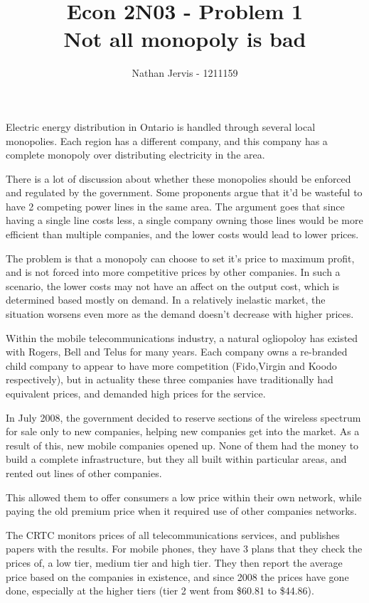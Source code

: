 \documentclass{article}
\title{Econ 2N03 - Problem 1\\Not all monopoly is bad}
\author{Nathan Jervis - 1211159}
\begin{document}
\maketitle

Electric energy distribution in Ontario is handled through several local monopolies. Each region has a different company, and this company has a complete monopoly over distributing electricity in the area.

There is a lot of discussion about whether these monopolies should be enforced and regulated by the government. Some proponents argue that it'd be wasteful to have 2 competing power lines in the same area. The argument goes that since having a single line costs less, a single company owning those lines would be more efficient than multiple companies, and the lower costs would lead to lower prices.

The problem is that a monopoly can choose to set it's price to maximum profit, and is not forced into more competitive prices by other companies. In such a scenario, the lower costs may not have an affect on the output cost, which is determined based mostly on demand. In a relatively inelastic market, the situation worsens even more as the demand doesn't decrease with higher prices.

Within the mobile telecommunications industry, a natural ogliopoloy has existed with Rogers, Bell and Telus for many years. Each company owns a re-branded child company to appear to have more competition (Fido,Virgin and Koodo respectively), but in actuality these three companies have traditionally had equivalent prices, and demanded high prices for the service.

In July 2008, the government decided to reserve sections of the wireless spectrum for sale only to new companies, helping new companies get into the market. As a result of this, new mobile companies opened up. None of them had the money to build a complete infrastructure, but they all built within particular areas, and rented out lines of other companies.

This allowed them to offer consumers a low price within their own network, while paying the old premium price when it required use of other companies networks.

The CRTC monitors prices of all telecommunications services, and publishes papers with the results. For mobile phones, they have 3 plans that they check the prices of, a low tier, medium tier and high tier. They then report the average price based on the companies in existence, and since 2008 the prices have gone done, especially at the higher tiers (tier 2 went from \$60.81 to \$44.86).
\end{document}
